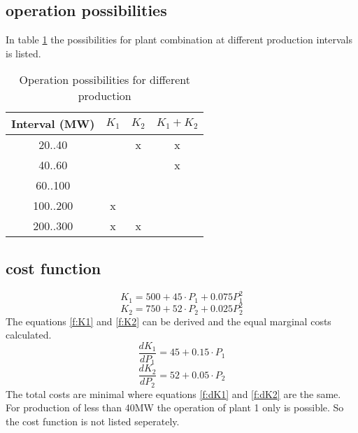 \documentclass{article}
\begin{document}
	\subsection{operation possibilities}
In table \ref{tab:oppos} the possibilities for plant combination at different production intervals is listed.
	\begin{table}[hbt!]
\begin{center}
\begin{tabular}[h]{|c|c|c|c|}
\hline 
Interval (MW)	 & $K_1$ 		& $K_2$ 		& $K_1+K_2$		\\ 
\hline
20..40 			& \checkmark	&	x			& x				\\
40..60 & 			\checkmark & \checkmark  & x				\\
60..100 & 		 \checkmark	& \checkmark	& \checkmark 	\\
100..200 		& x				& \checkmark	& \checkmark	\\
200..300 		& x				& x				& \checkmark	\\
\hline
\end{tabular}
\caption{Operation possibilities for different production}\label{tab:oppos}
\end{center}
\end{table}

\subsection{cost function}
	\begin{equation}
		K_1=500+45\cdot P_1 + 0.075 P_1^2
		\label{f:K1}
	\end{equation}
	\begin{equation}
		K_2=750+52\cdot P_2 + 0.025 P_2^2
		\label{f:K2}
	\end{equation}
The equations \ref{f:K1} and \ref{f:K2} can be derived and the equal marginal costs calculated.
	\begin{equation}
		\frac{dK_1}{dP_1}=45+0.15\cdot P_1
		\label{f:dK1}
	\end{equation}
	\begin{equation}
		\frac{dK_2}{dP_2}=52+0.05\cdot P_2
		\label{f:dK2}
	\end{equation}
	The total costs are minimal where equations \ref{f:dK1} and \ref{f:dK2} are the same. For production of less than 40MW the operation of plant 1 only is possible. So the cost function is not listed seperately.
\end{document}
